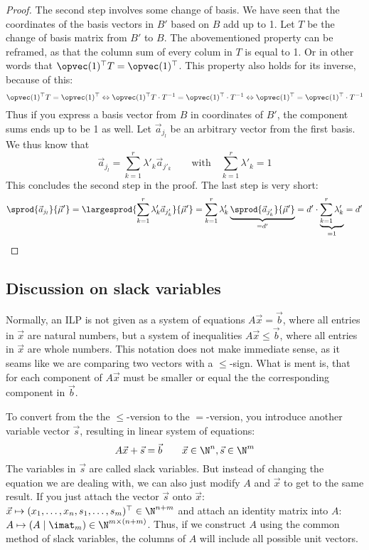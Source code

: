 \begin{proof}
    The second step involves some change of basis. We have seen that the coordinates of the basis vectors in $B'$ based on $B$ add up to 1. Let $T$ be the change of basis matrix from $B'$ to $B$. The abovementioned property can be reframed, as that the column sum of every colum in $T$ is equal to 1. Or in other words that $\opvec(1)^\top T = \opvec(1)^\top$. This property also holds for its inverse, because of this:
    $$\opvec(1)^\top T = \opvec(1)^\top \Leftrightarrow \opvec(1)^\top T\cdot T^{-1} = \opvec(1)^\top\cdot T^{-1} \Leftrightarrow \opvec(1)^\top = \opvec(1)^\top\cdot T^{-1}$$
    Thus if you express a basis vector from $B$ in coordinates of $B'$, the component sums ends up to be 1 as well. Let $\vec a_{j_l}$ be an arbitrary vector from the first basis. We thus know that
    $$\vec a_{j_l} = \sum_{k=1}^{r}\lambda'_k \vec a_{j'_k} \qquad \textrm{with}\quad \sum_{k=1}^{r}\lambda'_k = 1$$
    This concludes the second step in the proof. The last step is very short:
    $$\sprod{\vec a_{j_l}}{\vec\mu'} = \largesprod{\sum_{k=1}^{r}\lambda'_k \vec a_{j'_k}}{\vec\mu'} = \sum_{k=1}^{r} \lambda'_k \underbrace{\sprod{\vec a_{j'_k}}{\vec\mu'}}_{=d'} = d' \cdot \underbrace{\sum_{k=1}^{r} \lambda'_k}_{=1} = d'$$
\end{proof}

\subsection{Discussion on slack variables}
Normally, an ILP is not given as a system of equations $A\vec x = \vec b$, where all entries in $\vec x$ are natural numbers, but a system of inequalities $A\vec x \leq \vec b$, where all entries in $\vec x$ are whole numbers. This notation does not make immediate sense, as it seams like we are comparing two vectors with a $\leq$-sign. What is ment is, that for each component of $A\vec x$ must be smaller or equal the the corresponding component in $\vec b$. 

To convert from the the $\leq$-version to the $=$-version, you introduce another variable vector $\vec s$, resulting in linear system of equations:
$$A\vec x + \vec s = \vec b \qquad \vec x \in \N^n, \vec s \in\N^m$$
The variables in $\vec s$ are called slack variables. But instead of changing the equation we are dealing with, we can also just modify $A$ and $\vec x$ to get to the same result. If you just attach the vector $\vec s$ onto $\vec x$: $\vec x \mapsto (x_1, \dots, x_n, s_1, \dots, s_m)^\top \in \N^{n+m}$ and attach an identity matrix into $A$: $A \mapsto (A \mid\imat_m) \in \N^{m \times (n + m)}$. Thus, if we construct $A$ using the common method of slack variables, the columns of $A$ will include all possible unit vectors.

